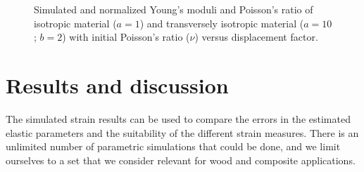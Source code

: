 \documentclass[3p]{elsarticle}
\begin{document}
\begin{center}
\begin{figure}[!ht]


\captionsetup{justification=centering}
\caption{Simulated and normalized Young's moduli and Poisson's ratio of
isotropic material ($a=1$) and transversely isotropic
material ($a=10$; $b=2$) with initial Poisson's ratio ($\nu$) versus
displacement factor.}

\label{fig:isovstriso}
\end{figure}

\end{center}


\color{black}


\section{Results and discussion}
The simulated strain results can be used to compare the errors in the estimated elastic parameters and the suitability of the different strain measures.
There is an unlimited number of parametric simulations that could be done, and we limit ourselves to a set that we consider relevant for wood and composite applications. 
\end{document}
